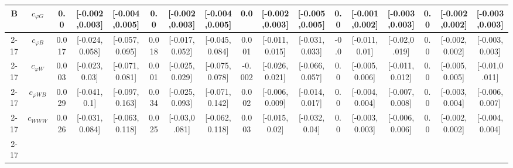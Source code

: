 \documentclass{article}
\begin{document}
\begin{table}[H]
\begin{tabular}{|c|c|c|c|c|c|c|c|c|c|c|c|c|c|c|c|c|}
\hline
\multirow{7}{*}{B}
 & $c_{\varphi G}$ & 0.0                             & [-0.002,0.003]                                 & [-0.004,0.005] & 0.0                             & [-0.002,0.003]                                 & [-0.004,0.005] & 0.0                             & [-0.002,0.003]                                 & [-0.005,0.005] & 0.0                             & [-0.001,0.002]                                 & [-0.003,0.003] & 0.0                             & [-0.002,0.002]                                 & [-0.003,0.003] \\ \cline{2-17}
 & $c_{\varphi B}$ & 0.017                             & [-0.024,0.058]                                 & [-0.057,0.095] & 0.018                             & [-0.017,0.052]                                 & [-0.045,0.084] & 0.001                             & [-0.011,0.015]                                 & [-0.031,0.033] & -0.0                             & [-0.011,0.01]                                 & [-0.02,0.019] & 0.0                             & [-0.002,0.002]                                 & [-0.003,0.003] \\ \cline{2-17}
 & $c_{\varphi W}$ & 0.003                             & [-0.023,0.03]                                 & [-0.071,0.081] & 0.001                             & [-0.025,0.029]                                 & [-0.075,0.078] & -0.002                             & [-0.026,0.021]                                 & [-0.066,0.057] & 0.0                             & [-0.005,0.006]                                 & [-0.011,0.012] & 0.0                             & [-0.005,0.005]                                 & [-0.01,0.011] \\ \cline{2-17}
 & $c_{\varphi WB}$ & 0.029                             & [-0.041,0.1]                                 & [-0.097,0.163] & 0.034                             & [-0.025,0.093]                                 & [-0.071,0.142] & 0.002                             & [-0.006,0.009]                                 & [-0.014,0.017] & 0.0                             & [-0.004,0.004]                                 & [-0.007,0.008] & 0.0                             & [-0.003,0.004]                                 & [-0.006,0.007] \\ \cline{2-17}
 & $c_{WWW}$ & 0.026                             & [-0.031,0.084]                                 & [-0.063,0.118] & 0.025                             & [-0.03,0.081]                                 & [-0.062,0.118] & 0.003                             & [-0.015,0.02]                                 & [-0.032,0.04] & 0.0                             & [-0.003,0.003]                                 & [-0.006,0.006] & 0.0                             & [-0.002,0.002]                                 & [-0.004,0.004] \\ \cline{2-17}

\end{tabular}
\end{table}
\end{document}
